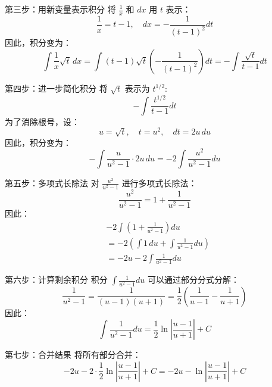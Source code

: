 \documentclass{beamer}
\begin{document}
\begin{frame}{第三步：用新变量表示积分}
将 $\frac{1}{x}$ 和 $dx$ 用 $t$ 表示：
$$
\frac{1}{x} = t - 1, \quad dx = -\frac{1}{(t - 1)^2} dt
$$
因此，积分变为：
$$
\int \frac{1}{x} \sqrt{t} \, dx = \int (t - 1) \sqrt{t} \left(-\frac{1}{(t - 1)^2}\right) dt = -\int \frac{\sqrt{t}}{t - 1} dt
$$
\end{frame}

\begin{frame}{第四步：进一步简化积分}
将 $\sqrt{t}$ 表示为 $t^{1/2}$:
$$
-\int \frac{t^{1/2}}{t - 1} dt
$$
为了消除根号，设：
$$
u = \sqrt{t}, \quad t = u^2, \quad dt = 2u \, du
$$
因此，积分变为：
$$
-\int \frac{u}{u^2 - 1} \cdot 2u \, du = -2 \int \frac{u^2}{u^2 - 1} du
$$
\end{frame}

\begin{frame}{第五步：多项式长除法}
对 $\frac{u^2}{u^2 - 1}$ 进行多项式长除法：
$$
\frac{u^2}{u^2 - 1} = 1 + \frac{1}{u^2 - 1}
$$
因此：
\begin{align*}
&-2 \int \left(1 + \frac{1}{u^2 - 1}\right) du \\
&= -2 \left( \int 1 \, du + \int \frac{1}{u^2 - 1} du \right) \\
&= -2u - 2 \int \frac{1}{u^2 - 1} du
\end{align*}
\end{frame}

\begin{frame}{第六步：计算剩余积分}
积分 $\int \frac{1}{u^2 - 1} du$ 可以通过部分分式分解：
$$
\frac{1}{u^2 - 1} 
= \frac{1}{(u - 1)(u + 1)} 
= \frac{1}{2} \left( \frac{1}{u - 1} - \frac{1}{u + 1} \right)
$$
因此：
$$
\int \frac{1}{u^2 - 1} du = \frac{1}{2} \ln \left| \frac{u - 1}{u + 1} \right| + C
$$
\end{frame}

\begin{frame}{第七步：合并结果}
将所有部分合并：
$$
-2u - 2 \cdot \frac{1}{2} \ln \left| \frac{u - 1}{u + 1} \right| + C 
= -2u - \ln \left| \frac{u - 1}{u + 1} \right| + C
$$
\end{frame}

\end{document}
